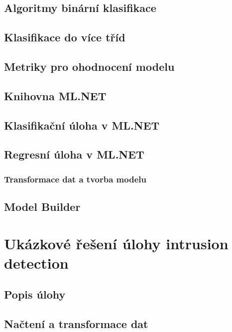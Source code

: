 \documentclass[male,czech,api_ing]{thesis}
\begin{document}
\section{Algoritmy binární klasifikace}

\section{Klasifikace do více tříd}

\section{Metriky pro ohodnocení modelu}

\section{Knihovna ML.NET}

\section{Klasifikační úloha v ML.NET}

\section{Regresní úloha v ML.NET}

\subsection{Transformace dat a tvorba modelu}

\section{Model Builder}

\chapter{Ukázkové řešení úlohy intrusion detection}

\section{Popis úlohy}

\section{Načtení a transformace dat}
\end{document}
